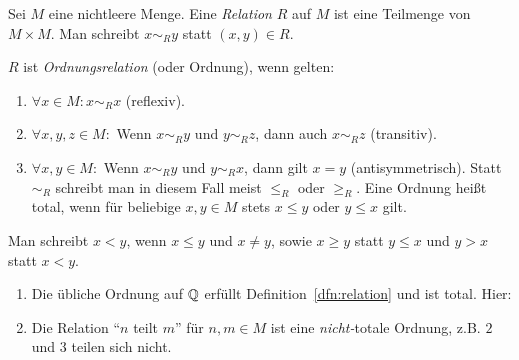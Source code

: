 \documentclass[12pt]{scrreprt}
\begin{document}
\begin{dfn}\label{dfn:relation}
Sei $M$ eine nichtleere Menge. Eine \emph{Relation} $R$ auf $M$ ist eine Teilmenge von $M \times M$. Man schreibt $x \sim_R y$ statt $(x, y) \in R$.

$R$ ist \emph{Ordnungsrelation} (oder Ordnung), wenn gelten:
\begin{enumerate} %
\item $\forall x \in M: x \sim_R x$ (reflexiv).
\item $\forall x, y, z \in M:$ Wenn $x \sim_R y$ und $y \sim_R z$, dann auch $x \sim_R z$ (transitiv).
\item\label{dfn:relation.antisymm} $\forall x, y \in M:$ Wenn $x \sim_R y$ und $y \sim_R x$, dann gilt $x = y$ (antisymmetrisch). Statt $\sim_R$ schreibt man in diesem Fall meist $\leq_R$ oder $\geq_R$. Eine Ordnung heißt total, wenn für beliebige $x, y \in M$ stets $x \leq y$ oder $y \leq x$ gilt.
\end{enumerate}

Man schreibt $x < y$, wenn $x \leq y$ und $x \ne y$, sowie $x \geq y$ statt $y \leq x$ und $y > x$ statt $x < y$.

\begin{bsp*}
\begin{enumerate} %
\item Die übliche Ordnung auf $\mathbb{Q}$ erfüllt Definition~\ref{dfn:relation} und ist total. Hier:


\item Die Relation "`$n$ teilt $m$"' für $n, m \in M$ ist eine \emph{nicht-}totale Ordnung, z.B. $2$ und $3$ teilen sich nicht.
\end{enumerate}
\end{bsp*}
\end{dfn}
\end{document}
